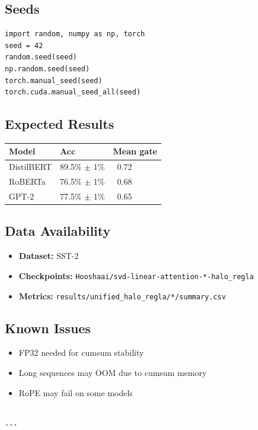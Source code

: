 \subsection{Seeds}

\begin{lstlisting}
import random, numpy as np, torch
seed = 42
random.seed(seed)
np.random.seed(seed)
torch.manual_seed(seed)
torch.cuda.manual_seed_all(seed)
\end{lstlisting}

\subsection{Expected Results}

\begin{table}[H]
\centering
\small
\begin{tabular}{lll}
\toprule
\textbf{Model} & \textbf{Acc} & \textbf{Mean gate} \\
\midrule
DistilBERT & 89.5\% $\pm$ 1\% & ~0.72 \\
RoBERTa & 76.5\% $\pm$ 1\% & ~0.68 \\
GPT-2 & 77.5\% $\pm$ 1\% & ~0.65 \\
\bottomrule
\end{tabular}
\end{table}

\subsection{Data Availability}

\begin{itemize}
\item \textbf{Dataset:} SST-2
\item \textbf{Checkpoints:} \texttt{Hooshaai/svd-linear-attention-*-halo\_regla}
\item \textbf{Metrics:} \texttt{results/unified\_halo\_regla/*/summary.csv}

\end{itemize}
\subsection{Known Issues}

\begin{itemize}
\item FP32 needed for cumsum stability
\item Long sequences may OOM due to cumsum memory
\item RoPE may fail on some models
\end{itemize}
\begin{lstlisting}

---
\end{lstlisting}